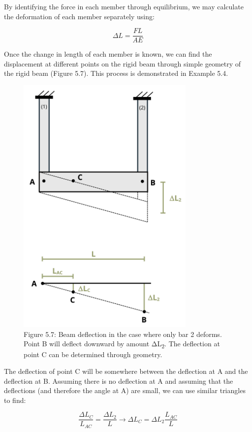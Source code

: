 \documentclass[
  letterpaper,
  DIV=11,
  numbers=noendperiod]{scrreprt}
\begin{document}
By identifying the force in each member through equilibrium, we may
calculate the deformation of each member separately using:

\[
\Delta L=\frac{F L}{A E}\]

Once the change in length of each member is known, we can find the
displacement at different points on the rigid beam through simple
geometry of the rigid beam (Figure 5.7). This process is demonstrated in
Example 5.4.

\begin{figure}[H]

{\centering \includegraphics[width=3.42708in,height=\textheight]{images/PNGs/Figure 5.8.png}

}

\caption{Figure 5.7: Beam deflection in the case where only bar 2
deforms. Point B will deflect downward by amount ΔL\textsubscript{2}.
The deflection at point C can be determined through geometry.}

\end{figure}%

The deflection of point C will be somewhere between the deflection at A
and the deflection at B. Assuming there is no deflection at A and
assuming that the deflections (and therefore the angle at A) are small,
we can use similar triangles to find:

\[
\frac{\Delta L_C}{L_{A C}}=\frac{\Delta L_2}{L} \rightarrow \Delta L_C=\Delta L_2 \frac{L_{A C}}{L}\]
\end{document}
